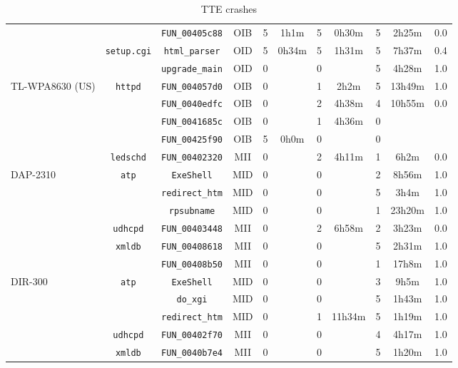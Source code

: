 \begin{table}[ht]
\begin{tabular}{|l||c|c|c|c|c|c|c|c|c|c|}
\cline{3-11}
 &  & \texttt{FUN\_00405c88} & OIB & 5 & 1h1m & 5 & 0h30m & 5 & 2h25m & 0.0 \\
\cline{3-11}
\cline{2-11}
 & \multirow{2}{*}{\texttt{setup.cgi}} & \texttt{html\_parser} & OID & 5 & 0h34m & 5 & 1h31m & 5 & 7h37m & 0.4 \\
\cline{3-11}
 &  & \texttt{upgrade\_main} & OID & 0 &  & 0 &  & 5 & 4h28m & 1.0 \\
\cline{3-11}
\cline{2-11}
\cline{1-1}
\multirow{5}{*}{TL-WPA8630 (US)} & \multirow{4}{*}{\texttt{httpd}} & \texttt{FUN\_004057d0} & OIB & 0 &  & 1 & 2h2m & 5 & 13h49m & 1.0 \\
\cline{3-11}
 &  & \texttt{FUN\_0040edfc} & OIB & 0 &  & 2 & 4h38m & 4 & 10h55m & 0.0 \\
\cline{3-11}
 &  & \texttt{FUN\_0041685c} & OIB & 0 &  & 1 & 4h36m & 0 &  &  \\
\cline{3-11}
 &  & \texttt{FUN\_00425f90} & OIB & 5 & 0h0m & 0 &  & 0 &  &  \\
\cline{3-11}
\cline{2-11}
 & \multirow{1}{*}{\texttt{ledschd}} & \texttt{FUN\_00402320} & MII & 0 &  & 2 & 4h11m & 1 & 6h2m & 0.0 \\
\cline{3-11}
\cline{2-11}
\cline{1-1}
\multirow{6}{*}{DAP-2310} & \multirow{3}{*}{\texttt{atp}} & \texttt{ExeShell} & MID & 0 &  & 0 &  & 2 & 8h56m & 1.0 \\
\cline{3-11}
 &  & \texttt{redirect\_htm} & MID & 0 &  & 0 &  & 5 & 3h4m & 1.0 \\
\cline{3-11}
 &  & \texttt{rpsubname} & MID & 0 &  & 0 &  & 1 & 23h20m & 1.0 \\
\cline{3-11}
\cline{2-11}
 & \multirow{1}{*}{\texttt{udhcpd}} & \texttt{FUN\_00403448} & MII & 0 &  & 2 & 6h58m & 2 & 3h23m & 0.0 \\
\cline{3-11}
\cline{2-11}
 & \multirow{2}{*}{\texttt{xmldb}} & \texttt{FUN\_00408618} & MII & 0 &  & 0 &  & 5 & 2h31m & 1.0 \\
\cline{3-11}
 &  & \texttt{FUN\_00408b50} & MII & 0 &  & 0 &  & 1 & 17h8m & 1.0 \\
\cline{3-11}
\cline{2-11}
\cline{1-1}
\multirow{5}{*}{DIR-300} & \multirow{3}{*}{\texttt{atp}} & \texttt{ExeShell} & MID & 0 &  & 0 &  & 3 & 9h5m & 1.0 \\
\cline{3-11}
 &  & \texttt{do\_xgi} & MID & 0 &  & 0 &  & 5 & 1h43m & 1.0 \\
\cline{3-11}
 &  & \texttt{redirect\_htm} & MID & 0 &  & 1 & 11h34m & 5 & 1h19m & 1.0 \\
\cline{3-11}
\cline{2-11}
 & \multirow{1}{*}{\texttt{udhcpd}} & \texttt{FUN\_00402f70} & MII & 0 &  & 0 &  & 4 & 4h17m & 1.0 \\
\cline{3-11}
\cline{2-11}
 & \multirow{1}{*}{\texttt{xmldb}} & \texttt{FUN\_0040b7e4} & MII & 0 &  & 0 &  & 5 & 1h20m & 1.0 \\
\cline{3-11}
\cline{2-11}
\cline{1-1}
\hline
\end{tabular}
\caption{TTE crashes}
\end{table}
